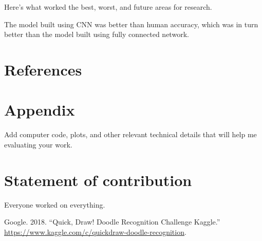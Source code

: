 \documentclass[]{article}
\begin{document}
Here's what worked the best, worst, and future areas for research.

The model built using CNN was better than human accuracy, which was in
turn better than the model built using fully connected network.

\hypertarget{references}{%
\section{References}\label{references}}

\hypertarget{appendix}{%
\section{Appendix}\label{appendix}}

Add computer code, plots, and other relevant technical details that will
help me evaluating your work.

\hypertarget{statement-of-contribution}{%
\section{Statement of contribution}\label{statement-of-contribution}}

Everyone worked on everything.

\hypertarget{refs}{}
\leavevmode\hypertarget{ref-QuickDra10}{}%
Google. 2018. ``Quick, Draw! Doodle Recognition Challenge \textbar{}
Kaggle.'' \url{https://www.kaggle.com/c/quickdraw-doodle-recognition}.
\end{document}
